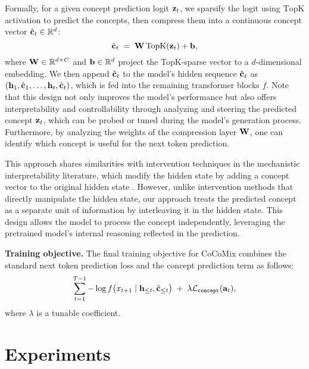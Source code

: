 \documentclass[]{fairmeta}
\newcommand{\sname}{CoCoMix\xspace}
\begin{document}
Formally, for a given concept prediction logit ${\mathbf{z}}_t$, we sparsify the logit using $\mathrm{TopK}$ activation to predict the concepts, then compress them into a continuous concept vector $\hat{{\mathbf{c}}}_t \in \mathbb{R}^{d}$:
\begin{equation}
    \hat{{\mathbf{c}}}_t \;=\; {\mathbf{W}}\, \mathrm{TopK}({\mathbf{z}}_t) + {\mathbf{b}},
    \label{eq:compress}
\end{equation}
where ${\mathbf{W}} \in \mathbb{R}^{d \times C}$ and ${\mathbf{b}} \in \mathbb{R}^{d}$ project the TopK-sparse vector to a $d$-dimensional embedding. We then append $\hat{{\mathbf{c}}}_t$ to the model’s hidden sequence $\hat{{\mathbf{c}}}_t$ as $({\mathbf{h}}_{1}, \hat{{\mathbf{c}}}_{1}, \ldots, {\mathbf{h}}_{t}, \hat{{\mathbf{c}}}_{t})$, which is fed into the remaining transformer blocks $f$. Note that this design not only improves the model’s performance but also offers interpretability and controllability through analyzing and steering the predicted concept ${\mathbf{z}}_t$, which can be probed or tuned during the model's generation process. Furthermore, by analyzing the weights of the compression layer ${\mathbf{W}}$, one can identify which concept is useful for the next token prediction. 

This approach shares similarities with intervention techniques in the mechanistic interpretability literature, which modify the hidden state by adding a concept vector to the original hidden state \citep{zou2023representation,wu2024reft}. However, unlike intervention methods that directly manipulate the hidden state, our approach treats the predicted concept as a separate unit of information by interleaving it in the hidden state. This design allows the model to process the concept independently, leveraging the pretrained model's internal reasoning reflected in the prediction. 

\textbf{Training objective.}
The final training objective for \sname combines the standard next token prediction loss and the concept prediction term as follows:
\begin{equation}
    \sum_{t=1}^{T-1} -\log f\bigl(x_{t+1}\mid {\mathbf{h}}_{\leq t}, \hat{{\mathbf{c}}}_{\leq t}\bigr)
    \;+\;
    \lambda \mathcal{L}_{\mathtt{concept}}({\mathbf{a}}_t),
    \label{eq:final}
\end{equation}
where $\lambda$ is a tunable coefficient. 



\section{Experiments}
\label{sec:experiments}
\end{document}
